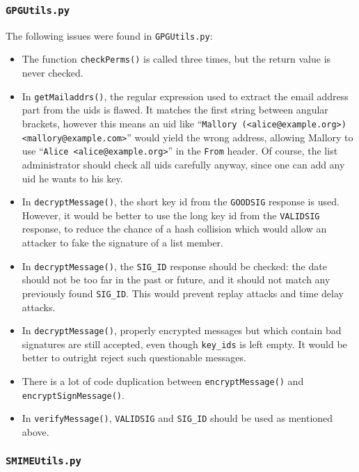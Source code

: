 \documentclass[a4]{article}
\newcommand{\file}[1]{\texttt{#1}}
\newcommand{\var}[1]{\texttt{#1}}
\newcommand{\func}[1]{\texttt{#1()}}
\newcommand{\hdr}[1]{\texttt{#1}}
\begin{document}
\subsubsection{\file{GPGUtils.py}}\label{sec:gpgutils}

The following issues were found in \file{GPGUtils.py}:

\begin{itemize}
\item The function \func{checkPerms} is called three times,
but the return value is never checked.
\item In \func{getMailaddrs}, the regular expression used to extract the email address part from the uids is flawed.
It matches the first string between angular brackets, however this means an uid like
``\texttt{Mallory (<alice@example.org>) <mallory@example.com>}'' would yield the wrong address,
allowing Mallory to use ``\texttt{Alice <alice@example.org>}'' in the \hdr{From} header.
Of course, the list administrator should check all uids carefully anyway,
since one can add any uid he wants to his key.
\item In \func{decryptMessage}, the short key id from the \verb|GOODSIG| response is used.
However, it would be better to use the long key id from the \verb|VALIDSIG| response,
to reduce the chance of a hash collision which would allow an attacker to fake the signature of a list member.
\item In \func{decryptMessage}, the \verb|SIG_ID| response should be checked:
the date should not be too far in the past or future,
and it should not match any previously found \verb|SIG_ID|.
This would prevent replay attacks and time delay attacks.
\item In \func{decryptMessage}, properly encrypted messages but which contain bad signatures are still accepted,
even though \var{key\_ids} is left empty. It would be better to outright reject such questionable messages.
\item There is a lot of code duplication between \func{encryptMessage} and \func{encryptSignMessage}.
\item In \func{verifyMessage}, \verb|VALIDSIG| and \verb|SIG_ID| should be used as mentioned above.
\end{itemize}

\subsubsection{\file{SMIMEUtils.py}}\label{sec:smimeutils}
\end{document}
